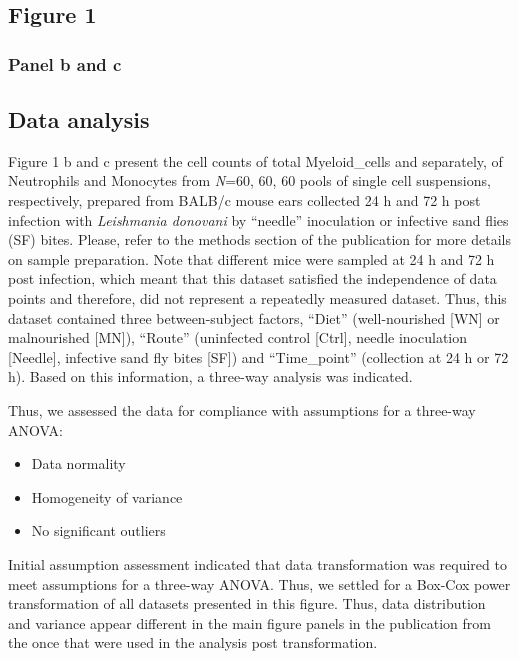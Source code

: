 \documentclass[
  12pt,
  letterpaper,
]{article}
\providecommand{\tightlist}{%
  \setlength{\itemsep}{0pt}\setlength{\parskip}{0pt}}
\begin{document}
\subsection{Figure 1}\label{figure-1}

\subsubsection{Panel b and c}\label{panel-b-and-c}

\subsection{Data analysis}\label{data-analysis}

Figure 1 b and c present the cell counts of total Myeloid\_cells and separately, of Neutrophils and Monocytes from \emph{N}=60, 60, 60 pools of single cell suspensions, respectively, prepared from BALB/c mouse ears collected 24 h and 72 h post infection with \emph{Leishmania donovani} by ``needle'' inoculation or infective sand flies (SF) bites. Please, refer to the methods section of the publication for more details on sample preparation. Note that different mice were sampled at 24 h and 72 h post infection, which meant that this dataset satisfied the independence of data points and therefore, did not represent a repeatedly measured dataset. Thus, this dataset contained three between-subject factors, ``Diet'' (well-nourished {[}WN{]} or malnourished {[}MN{]}), ``Route'' (uninfected control {[}Ctrl{]}, needle inoculation {[}Needle{]}, infective sand fly bites {[}SF{]}) and ``Time\_point'' (collection at 24 h or 72 h). Based on this information, a three-way analysis was indicated.

Thus, we assessed the data for compliance with assumptions for a three-way ANOVA:

\begin{itemize}
\tightlist
\item
  Data normality
\item
  Homogeneity of variance
\item
  No significant outliers
\end{itemize}

Initial assumption assessment indicated that data transformation was required to meet assumptions for a three-way ANOVA. Thus, we settled for a Box-Cox power transformation of all datasets presented in this figure. Thus, data distribution and variance appear different in the main figure panels in the publication from the once that were used in the analysis post transformation.
\end{document}
